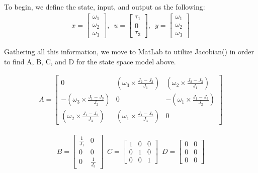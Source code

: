 \documentclass[12pt]{article}
\begin{document}
To begin, we define the state, input, and output as the following:\\
\begin{align*}
x = 
    \begin{bmatrix}
    \omega _{1} \\ \omega _{2} \\ \omega _{3}
    \end{bmatrix},\enspace
u = 
    \begin{bmatrix}
    \tau _{1} \\ 0 \\ \tau _{3}
    \end{bmatrix},\enspace
y = 
    \begin{bmatrix}
    \omega _{1} \\ \omega _{2} \\ \omega _{3}
    \end{bmatrix}
\end{align*}    

Gathering all this information, we move to MatLab to utilize Jacobian() in order to find A, B, C, and D for the state space model above.

\begin{align*}
A = 
    \begin{bmatrix}
    0 & (\omega _{3} \times \frac{J _{2} - J _{3}}{J _{1}}) & (\omega _{2} \times \frac{J _{2} - J _{3}}{J _{1}}) \\ -(\omega _{3} \times \frac{J _{1} - J _{3}}{J _{2}}) & 0 & -(\omega _{1} \times \frac{J _{1} - J _{3}}{J _{2}}) \\ (\omega _{2} \times \frac{J _{1} - J _{2}}{J _{3}}) & (\omega _{1} \times \frac{J _{1} - J _{2}}{J _{3}}) & 0
    \end{bmatrix}
\end{align*}

\begin{align*}
    B =
    \begin{bmatrix}
    \frac{1}{J _{1}} & 0 \\ 0 & 0 \\ 0 & \frac{1}{J _{3}}
    \end{bmatrix} \enspace
    C = 
        \begin{bmatrix}
            1 & 0 & 0 \\ 0 & 1 & 0 \\ 0 & 0 & 1
        \end{bmatrix} \enspace
    D =
        \begin{bmatrix}
            0 & 0 \\ 0 & 0 \\ 0 & 0
        \end{bmatrix}
\end{align*}
\end{document}
